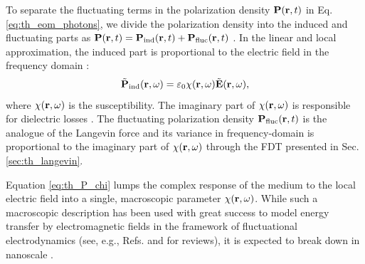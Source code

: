 To separate the fluctuating terms in the polarization density $\mathbf{P}(\mathbf{r},t)$ in Eq. \eqref{eq:th_eom_photons}, we divide the polarization density into the induced and fluctuating parts as $\mathbf{P}(\mathbf{r},t)=\mathbf{P}_{\textrm{ind}}(\mathbf{r},t)+ \mathbf{P}_{\textrm{fluc}}(\mathbf{r},t)$ \cite{benabdallah11}. In the linear and local approximation, the induced part is proportional to the electric field in the frequency domain \cite{novotny}:
\begin{equation}
 \tilde{\mathbf{P}}_{\textrm{ind}}(\mathbf{r},\omega)= \varepsilon_0 \chi(\mathbf{r},\omega) \tilde{\mathbf{E}}(\mathbf{r},\omega), \label{eq:th_P_chi}
\end{equation}
where $\chi(\mathbf{r},\omega)$ is the susceptibility. The imaginary part of $\chi(\mathbf{r},\omega)$ is responsible for dielectric losses \cite{jackson}. The fluctuating polarization density $\mathbf{P}_{\textrm{fluc}}(\mathbf{r},t)$ is the analogue of the Langevin force and its variance in frequency-domain is proportional to the imaginary part of $\chi(\mathbf{r},\omega)$ through the FDT presented in Sec. \ref{sec:th_langevin}.

Equation \eqref{eq:th_P_chi} lumps the complex response of the medium to the local electric field into a single, macroscopic parameter $\chi(\mathbf{r},\omega)$. While such a macroscopic description has been used with great success to model energy transfer by electromagnetic fields in the framework of fluctuational electrodynamics \cite{rytov} (see, e.g., Refs. \cite{volokitin07} and \cite{joulain05} for reviews), it is expected to break down in nanoscale \cite{chalopin12b}. 

